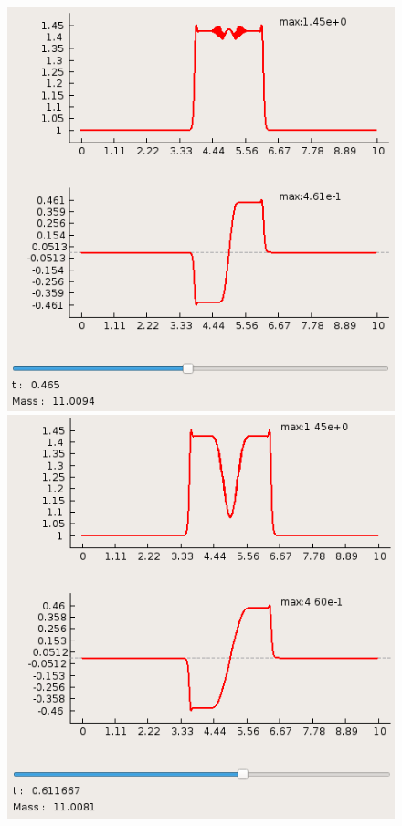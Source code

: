 \documentclass[a4paper, 11pt]{article}
\begin{document}
\begin{figure}[h]
	\begin{minipage}[H] {0.49\linewidth}
		\includegraphics[width=1\linewidth]{p1/p1_t=0,465.png}
	\end{minipage}%
		\begin{minipage}[H] {0.49\linewidth}
		\includegraphics[width=1\linewidth]{p1/p1_t=0,611.png}

\end{minipage}
\end{figure}
\end{document}
